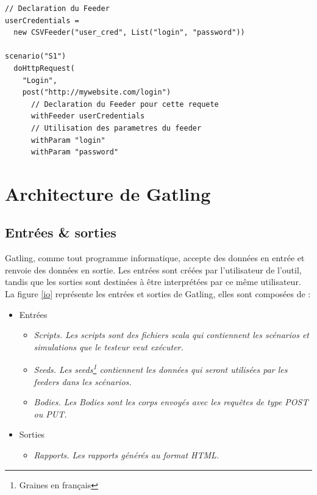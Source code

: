 \begin{lstlisting}[caption={Utilisation des Feeders},label={use_feeder}]
// Declaration du Feeder
userCredentials = 
  new CSVFeeder("user_cred", List("login", "password"))

scenario("S1")
  doHttpRequest(
    "Login",
    post("http://mywebsite.com/login")
      // Declaration du Feeder pour cette requete
      withFeeder userCredentials
      // Utilisation des parametres du feeder
      withParam "login"
      withParam "password"
\end{lstlisting}


\section{Architecture de Gatling}
\subsection{Entrées \& sorties}
Gatling, comme tout programme informatique, accepte des données en entrée et renvoie des données en sortie. Les entrées sont créées par l'utilisateur de l'outil, tandis que les sorties sont destinées à être interprétées par ce même utilisateur. La figure \ref{io} représente les entrées et sorties de Gatling, elles sont composées de :

\begin{itemize}
  \item Entrées
  \begin{itemize}
	\item \em{Scripts}. Les scripts sont des fichiers scala qui contiennent les scénarios et simulations que le testeur veut exécuter.
  	\item \em{Seeds}. Les seeds\footnote{Graines en français} contiennent les données qui seront utilisées par les feeders dans les scénarios.
  	\item \em{Bodies}. Les Bodies sont les corps envoyés avec les requêtes de type POST ou PUT.
  \end{itemize}
  \item Sorties
  \begin{itemize}
    \item \em{Rapports}. Les rapports générés au format HTML.
  \end{itemize}
\end{itemize}

